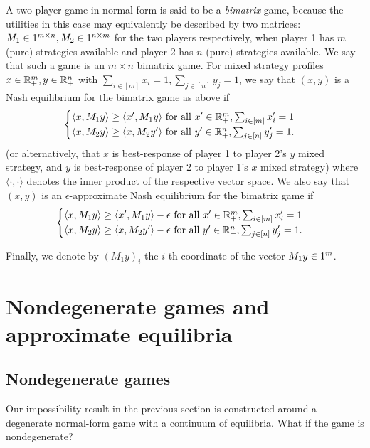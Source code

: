 \documentclass[11pt]{article}
\begin{document}
A two-player game in normal form is said to be a {\em bimatrix} game, because the utilities in this case may equivalently be described by two matrices: $M_1\in1^{m\times n}, M_2\in1^{n\times m}$ for the two players respectively, when player 1 has $m$ (pure) strategies available and player 2 has $n$ (pure) strategies available. We say that such a game is an $m\times n$ bimatrix game. For mixed strategy profiles $x \in {\mathbb{R}_+^m}, y \in {\mathbb{R}_+^n}$ with $\sum_{i\in [m]} x_i = 1, \sum_{j\in [n]} y_j = 1$, we say that $(x, y)$ is a Nash equilibrium for the bimatrix game as above if
\[
\begin{cases}
\langle x, M_1 y \rangle \geq \langle x', M_1 y \rangle\ \text{for all } x' \in {\mathbb{R}_+^m}, \sum_{i\in [m]} x_i' = 1 \\
\langle x, M_2 y \rangle \geq \langle x, M_2 y' \rangle\ \text{for all }  y' \in {\mathbb{R}_+^n}, \sum_{j\in [n]} y_j' = 1.
\end{cases}
\]
(or alternatively, that $x$ is best-response of player 1 to player 2's $y$ mixed strategy, and $y$ is best-response of player 2 to player 1's $x$ mixed strategy) where $\langle \cdot, \cdot \rangle$ denotes the inner product of the respective vector space. We also say that $(x, y)$ is an $\epsilon$-approximate Nash equilibrium for the bimatrix game if
\[
\begin{cases}
\langle x, M_1 y \rangle \geq \langle x', M_1 y \rangle - \epsilon\ \text{for all } x' \in \Rpm, \sum_{i\in [m]} x_i' = 1 \\
\langle x, M_2 y \rangle \geq \langle x, M_2 y' \rangle - \epsilon\ \text{for all } y' \in \Rpn, \sum_{j\in [n]} y_j' = 1.
\end{cases}
\]

Finally, we denote by $(M_1 y)_i$ the $i$-th coordinate of the vector $M_1 y\in1^m$.










\section{Nondegenerate games and approximate equilibria}

\subsection{Nondegenerate games}

Our impossibility result in the previous section is constructed around a degenerate normal-form game with a continuum of equilibria.  
What if the game is nondegenerate?
\end{document}
